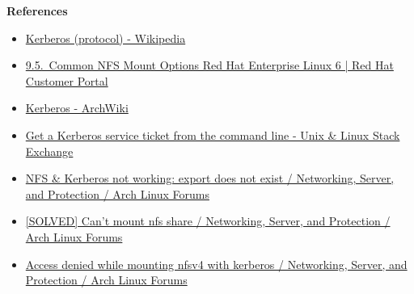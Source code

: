 \documentclass[12pt, a4paper]{article}
\begin{document}
  \textbf{References}
  \begin{itemize}
    \item \href{https://en.wikipedia.org/wiki/Kerberos_(protocol)}{Kerberos (protocol) - Wikipedia}
    \item \href{https://access.redhat.com/documentation/zh-tw/red_hat_enterprise_linux/6/html/storage_administration_guide/s1-nfs-client-config-options}{9.5. Common NFS Mount Options Red Hat Enterprise Linux 6 | Red Hat Customer Portal}
    \item \href{https://wiki.archlinux.org/title/Kerberos}{Kerberos - ArchWiki}
    \item \href{https://unix.stackexchange.com/questions/134577/get-a-kerberos-service-ticket-from-the-command-line}{Get a Kerberos service ticket from the command line - Unix \& Linux Stack Exchange}
    \item \href{https://bbs.archlinux.org/viewtopic.php?id=272600}{NFS \& Kerberos not working: export does not exist / Networking, Server, and Protection / Arch Linux Forums}
    \item \href{https://bbs.archlinux.org/viewtopic.php?id=200165}{[SOLVED] Can't mount nfs share / Networking, Server, and Protection / Arch Linux Forums}
    \item \href{https://bbs.archlinux.org/viewtopic.php?id=289640}{Access denied while mounting nfsv4 with kerberos / Networking, Server, and Protection / Arch Linux Forums}
  \end{itemize}
\end{document}
